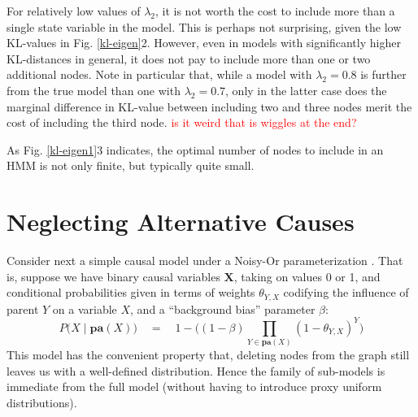 \documentclass[10pt,letterpaper]{article}
\newcommand{\red}[1]{\textcolor{Red}{#1}}
\begin{document}
\noindent For relatively low values of $\lambda_2$, it is not worth the cost to include more than a single state variable in the model. This is perhaps not surprising, given the low KL-values in Fig. \ref{kl-eigen}2. However, even in models with significantly higher KL-distances in general, it does not pay to include more than one or two additional nodes. Note in particular that, while a model with $\lambda_2=0.8$ is further from the true model than one with $\lambda_2=0.7$, only in the latter case does the marginal difference in KL-value between including two and three nodes merit the cost of including the third node. \red{is it weird that is wiggles at the end?}

As Fig. \ref{kl-eigen1}3 indicates, the optimal number of nodes to include in an HMM is not only finite, but typically quite small.

\section{Neglecting Alternative Causes}

Consider next a simple causal model under a Noisy-Or parameterization \citep{Cheng}. That is, suppose we have binary causal variables $\textbf{X}$, taking on values 0 or 1, and conditional probabilities given in terms of weights $\theta_{Y,X}$ codifying the influence of parent $Y$ on a variable $X$, and a ``background bias'' parameter $\beta$: $$P\big(X\mid \textbf{pa}(X)\big) \quad = \quad 1-\Big((1-\beta)\prod_{Y \in \textbf{pa}(X)} (1-\theta_{Y,X})^Y\Big)$$
This model has the convenient property that, deleting nodes from the graph still leaves us with a well-defined distribution. Hence the family of sub-models is immediate from the full model (without having to introduce proxy uniform distributions).
\end{document}

